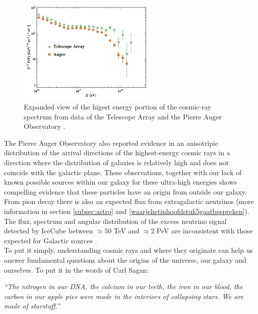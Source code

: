 \begin{figure}
\label{fig:ankle}
\centering
\includegraphics[width=0.6\textwidth]{chapter3/img/ankle.png}
\caption{Expanded view of the higest energy portion of the cosmic-ray spectrum from data of the Telescope Array and the Pierre Auger Observatory \cite{pdg2018}.}
\end{figure}
The Pierre Auger Observatory also reported evidence in an anisotripic distribution of the arrival directions of the highest-energy cosmic rays \cite{Aab:2017tyv} in a direction where the distribution of galaxies is relatively high and does not coincide with the galactic plane. These observations, together with our lack of known possible sources within our galaxy for these ultra-high energies shows compelling evidence that these particles have an origin from outside our galaxy. From pion decay there is also an expected flux from extragalactic neutrinos (more information in section \ref{subsec:astro} and \ref{waarjehetinhoofdstuk5gaatbespreken}). The flux, spectrum and angular distribution of the excess neutrino signal detected by IceCube between $\approx 50$ TeV and $\approx 2$ PeV are inconsistent with those expected for Galactic sources \cite{Waxman:2013zda}.\\
\newline
To put it simply, understanding cosmic rays and where they originate can help us answer fundamental questions about the origins of the universe, our galaxy and ourselves. To put it in the words of Carl Sagan:

\begin{center}
\begin{minipage}[5cm]{0.9\textwidth}
\textit{``The nitrogen in our DNA, the calcium in our teeth, the iron in our blood, the carbon in our apple pies were made in the interiors of collapsing stars. We are made of starstuff.''}
\end{minipage}
\end{center}


